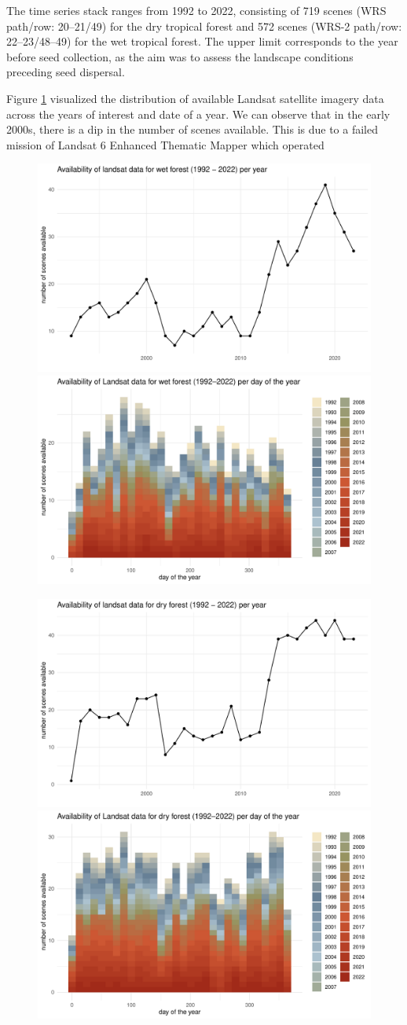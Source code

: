 The time series stack ranges from 1992 to 2022, consisting of 719 scenes (WRS path/row: 20–21/49) for the dry tropical forest and 572 scenes (WRS-2 path/row: 22–23/48–49) for the wet tropical forest. The upper limit corresponds to the year before seed collection, as the aim was to assess the landscape conditions preceding seed dispersal.

Figure \ref{fig:satellite} visualized the distribution of available Landsat satellite imagery data across the years of interest and date of a year. We can observe that in the early 2000s, there is a dip in the number of scenes available. This is due to a failed mission of Landsat 6 Enhanced Thematic Mapper which operated 



\begin{figure}[H]
\centering

\includegraphics[width=0.48\linewidth, keepaspectratio]{Report/figures/wf_sd1.pdf}
\hspace{0.02\linewidth}
\includegraphics[width=0.48\linewidth, keepaspectratio]{Report/figures/wf_sd2.pdf}

\vspace{1cm} %

\includegraphics[width=0.48\linewidth, keepaspectratio]{Report/figures/df_sd1.pdf}
\hspace{0.02\linewidth}
\includegraphics[width=0.48\linewidth, keepaspectratio]{Report/figures/df_sd2.pdf}

\caption{}
\label{fig:satellite}
\end{figure}


